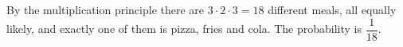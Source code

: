 By the multiplication principle there are $3\cdot2\cdot3=18$ different meals, all equally likely, and exactly one of them is pizza, fries and cola. The probability is $\boxed{\dfrac{1}{18}}$.

